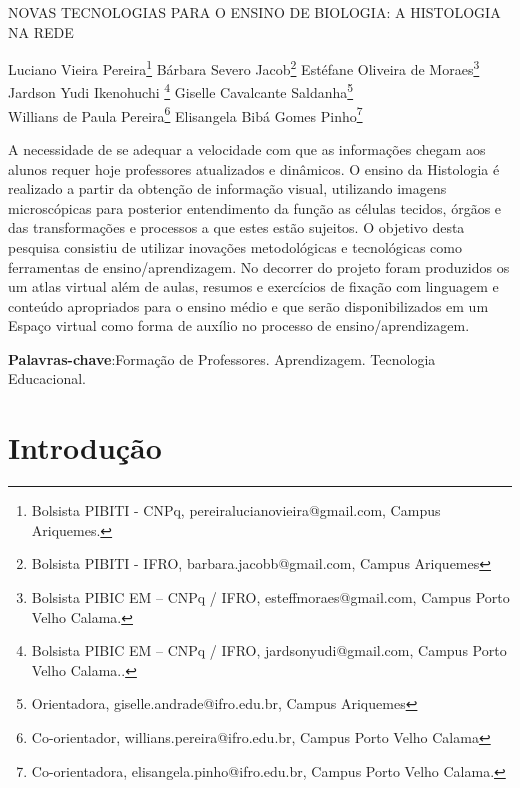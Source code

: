 \documentclass[article,12pt,onesidea,4paper,english,brazil]{abntex2}
\begin{document}
	
	
	\frenchspacing 
	
	\begin{center}
		\LARGE 
		NOVAS TECNOLOGIAS PARA O ENSINO DE BIOLOGIA: A HISTOLOGIA NA REDE
		
		
		\normalsize
		Luciano Vieira Pereira\footnote{Bolsista PIBITI - CNPq, pereiralucianovieira@gmail.com, Campus Ariquemes.} 
		Bárbara Severo Jacob\footnote{Bolsista PIBITI - IFRO, barbara.jacobb@gmail.com, Campus Ariquemes} 
		Estéfane Oliveira de Moraes\footnote{Bolsista PIBIC EM – CNPq / IFRO, esteffmoraes@gmail.com, Campus Porto Velho Calama.} \\
	Jardson Yudi Ikenohuchi \footnote{Bolsista PIBIC EM – CNPq / IFRO, jardsonyudi@gmail.com, Campus Porto Velho Calama..} 
			Giselle Cavalcante Saldanha\footnote{Orientadora, giselle.andrade@ifro.edu.br, Campus Ariquemes}\\
				Willians de Paula Pereira\footnote{Co-orientador, willians.pereira@ifro.edu.br, Campus Porto Velho Calama}
				Elisangela Bibá Gomes Pinho\footnote{Co-orientadora, elisangela.pinho@ifro.edu.br, Campus Porto Velho Calama.}
	\end{center}
	
	\begin{resumoumacoluna}
	A necessidade de se adequar a velocidade com que as informações chegam aos alunos requer hoje professores atualizados e dinâmicos. O ensino da Histologia é realizado a partir da obtenção de informação visual, utilizando imagens microscópicas para posterior entendimento da função as células tecidos, órgãos e das transformações e processos a que estes estão sujeitos. O objetivo desta pesquisa consistiu de utilizar inovações metodológicas e tecnológicas como ferramentas de ensino/aprendizagem. No decorrer do projeto foram produzidos os um atlas virtual além de aulas, resumos e exercícios de fixação com linguagem e conteúdo apropriados para o ensino médio e que serão disponibilizados em um Espaço virtual como forma de auxílio no processo de ensino/aprendizagem.
		
		\vspace{\onelineskip}
		
		\noindent
		\textbf{Palavras-chave}:Formação de Professores. Aprendizagem. Tecnologia Educacional.
	\end{resumoumacoluna}
	
	\section*{Introdução}
	
\end{document}
